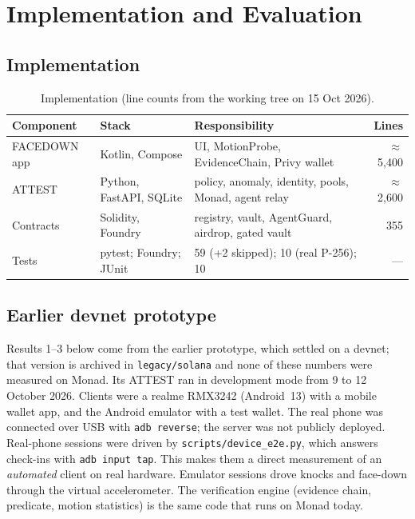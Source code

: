 \documentclass[10pt]{article}
\newcommand{\code}[1]{\texttt{\small #1}}
\begin{document}
\section{Implementation and Evaluation}\label{sec:eval}

\subsection{Implementation}
\begin{table}[h]\small\centering
\caption{Implementation (line counts from the working tree on 15 Oct 2026).}\label{tab:impl}
\begin{tabular}{@{}lllr@{}}\toprule
\textbf{Component} & \textbf{Stack} & \textbf{Responsibility} & \textbf{Lines}\\\midrule
FACEDOWN app & Kotlin, Compose & UI, MotionProbe, EvidenceChain, Privy wallet & $\approx$5,400\\
ATTEST & Python, FastAPI, SQLite & policy, anomaly, identity, pools, Monad, agent relay & $\approx$2,600\\
Contracts & Solidity, Foundry & registry, vault, AgentGuard, airdrop, gated vault & 355\\\midrule
Tests & pytest; Foundry; JUnit & 59 (+2 skipped); 10 (real P-256); 10 & ---\\\bottomrule
\end{tabular}
\end{table}

\subsection{Earlier devnet prototype}
Results 1--3 below come from the earlier prototype, which settled on a devnet; that version is archived in
\code{legacy/solana} and none of these numbers were measured on Monad. Its ATTEST ran in development mode from 9 to 12
October 2026. Clients were a realme RMX3242 (Android~13) with a mobile wallet app, and the Android emulator with a test
wallet. The real phone was connected over USB with \code{adb reverse}; the server was not publicly deployed. Real-phone
sessions were driven by \code{scripts/device\_e2e.py}, which answers check-ins with \code{adb input tap}. This makes them a
direct measurement of an \emph{automated} client on real hardware. Emulator sessions drove knocks and face-down through
the virtual accelerometer. The verification engine (evidence chain, predicate, motion statistics) is the same code that
runs on Monad today.
\end{document}
